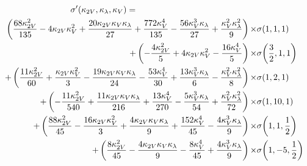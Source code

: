 {\begin{columns}
\begin{column}{0.8\textwidth}
{\begin{minipage}{1.0\textwidth}
            \vspace{10mm}
            {\tiny \begin{equation}
            \begin{split}
                \sigma'(\kvv, \kl, \kv) = \hspace{50mm}& \\
                \left(\frac{68 \kappa_{2V}^{2}}{135} - 4 \kappa_{2V} \kappa_{V}^{2} + \frac{20 \kappa_{2V} \kappa_{V} \kappa_{\lambda}}{27} + \frac{772 \kappa_{V}^{4}}{135} - \frac{56 \kappa_{V}^{3} \kappa_{\lambda}}{27} + \frac{\kappa_{V}^{2} \kappa_{\lambda}^{2}}{9}\right)
                    \times & \sigma{\left(1,1,1 \right)} \\
                + \left(- \frac{4 \kappa_{2V}^{2}}{5} + 4 \kappa_{2V} \kappa_{V}^{2} - \frac{16 \kappa_{V}^{4}}{5}\right)
                    \times & \sigma{\left(\frac{3}{2},1,1 \right)} \\
                + \left(\frac{11 \kappa_{2V}^{2}}{60} + \frac{\kappa_{2V} \kappa_{V}^{2}}{3} - \frac{19 \kappa_{2V} \kappa_{V} \kappa_{\lambda}}{24} - \frac{53 \kappa_{V}^{4}}{30} + \frac{13 \kappa_{V}^{3} \kappa_{\lambda}}{6} - \frac{\kappa_{V}^{2} \kappa_{\lambda}^{2}}{8}\right)
                    \times & \sigma{\left(1,2,1 \right)} \\
                + \left(- \frac{11 \kappa_{2V}^{2}}{540} + \frac{11 \kappa_{2V} \kappa_{V} \kappa_{\lambda}}{216} + \frac{13 \kappa_{V}^{4}}{270} - \frac{5 \kappa_{V}^{3} \kappa_{\lambda}}{54} + \frac{\kappa_{V}^{2} \kappa_{\lambda}^{2}}{72}\right)
                    \times & \sigma{\left(1,10,1 \right)}  \\
                + \left(\frac{88 \kappa_{2V}^{2}}{45} - \frac{16 \kappa_{2V} \kappa_{V}^{2}}{3} + \frac{4 \kappa_{2V} \kappa_{V} \kappa_{\lambda}}{9} + \frac{152 \kappa_{V}^{4}}{45} - \frac{4 \kappa_{V}^{3} \kappa_{\lambda}}{9}\right)
                    \times & \sigma{\left(1,1,\frac{1}{2} \right)} \\
                + \left(\frac{8 \kappa_{2V}^{2}}{45} - \frac{4 \kappa_{2V} \kappa_{V} \kappa_{\lambda}}{9} - \frac{8 \kappa_{V}^{4}}{45} + \frac{4 \kappa_{V}^{3} \kappa_{\lambda}}{9}\right)
                    \times & \sigma{\left(1,-5,\frac{1}{2} \right)}
                \nonumber
            \end{split} \end{equation}}

            \end{minipage}}
        \end{column}
    \end{columns}
}

